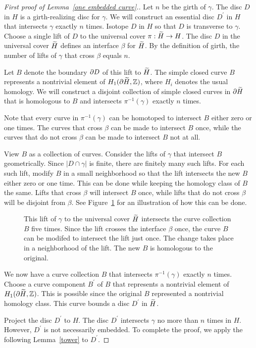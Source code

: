 \begin{proof}[First proof of Lemma~\ref{one embedded curve}.]
Let $n$ be the girth of $\gamma$.  The disc $D$ in $H$ is a girth-realizing disc for $\gamma$.  We will construct an essential disc $D^{\prime}$ in $H$ that intersects $\gamma$ exactly $n$ times.  Isotope $D$ in $H$ so that $D$ is transverse to $\gamma$.  Choose a single lift of $D$ to the universal cover $\pi:\widetilde{H}\rightarrow H$.  The disc $D$ in the universal cover $\widetilde{H}$ defines an interface $\beta$ for $\widetilde{H}$.  By the definition of girth, the number of lifts of $\gamma$ that cross $\beta$ equals $n$. 

Let $B$ denote the boundary $\partial D$ of this lift to $\widetilde{H}$.  The simple closed curve $B$ represents a nontrivial element of $H_{1}(\partial \widetilde{H},{\mathbb Z})$, where $H_{i}$ denotes the usual homology.  We will construct a disjoint collection of simple closed curves in $\partial \widetilde{H}$ that is homologous to $B$ and intersects $\pi^{-1}(\gamma)$ exactly $n$ times.  

Note that every curve in $\pi^{-1}(\gamma)$ can be homotoped to intersect $B$ either zero or one times.  The curves that cross $\beta$ can be made to intersect $B$ once, while the curves that do not cross $\beta$ can be made to intersect $B$ not at all.

View $B$ as a collection of curves.  Consider the lifts of $\gamma$ that intersect $B$ geometrically.  Since $|D\cap\gamma|$ is finite, there are finitely many such lifts.  For each such lift, modify $B$ in a small neighborhood so that the lift intersects the new $B$ either zero or one time.  This can be done while keeping the homology class of $B$ the same.  Lifts that cross $\beta$ will intersect $B$ once, while lifts that do not cross $\beta$ will be disjoint from $\beta$.  See Figure~\ref{curvemodify} for an illustration of how this can be done.

\begin{figure}
\caption{
This lift of $\gamma$ to the universal cover $\widetilde{H}$ intersects the curve collection $B$ five times.  Since the lift crosses the interface $\beta$ once, the curve $B$ can be modifed to intersect the lift just once.  The change takes place in a neighborhood of the lift.  The new $B$ is homologous to the original.
}
\label{curvemodify}
\end{figure}

We now have a curve collection $B$ that intersects $\pi^{-1}(\gamma)$ exactly $n$ times.  Choose a curve component $B^{\prime}$ of $B$ that represents a nontrivial element of $H_{1}(\partial \widetilde{H},{\mathbb Z})$.  This is possible since the original $B$ represented a nontrivial homology class.  This curve bounds a disc $D^{\prime}$ in $\widetilde{H}$.

Project the disc $D^{\prime}$ to $H$.  The disc $D^{\prime}$ intersects $\gamma$ no more than $n$ times in $H$.  However, $D^{\prime}$ is not necessarily embedded.  To complete the proof, we apply the following Lemma~\ref{tower} to $D^{\prime}$.
\end{proof}

